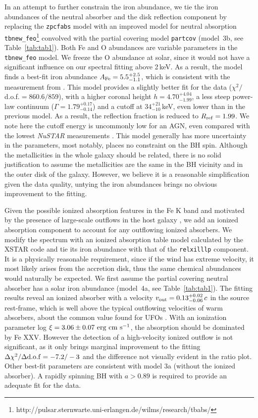 \documentclass[]{emulateapj}
\def \nustar {{\em NuSTAR }}
\begin{document}
In an attempt to further constrain the iron abundance, we tie the iron abundances of the neutral absorber and the disk reflection component by replacing the {\tt zpcfabs} model with an improved model for neutral absorption {\tt tbnew\_feo}\footnote{http://pulsar.sternwarte.uni-erlangen.de/wilms/research/tbabs/} convolved with the partial covering model {\tt partcov} (model~3b, see Table~\ref{tab:tab1}). Both Fe and O abundances are variable parameters in the {\tt tbnew\_feo} model. We freeze the O abundance at solar, since it would not have a significant influence on our spectral fitting above 2\,keV.  As a result, the model finds a best-fit iron abundance $A_{\rm Fe} = 5.5^{+2.5}_{-1.1}$, which is consistent with the measurement from \citealt{wes12}. This model provides a slightly better fit for the data ($\chi^{2}/$d.o.f.$=860.6/859$), with a higher coronal height $h = 4.70^{+4.04}_{-1.99}$, a less steep power-law continuum ($\Gamma = 1.79^{+0.17}_{-0.14}$) and a cutoff at $34^{+21}_{-10}$\,keV, even lower than in the previous model. As a result, the reflection fraction is reduced to $R_{\rm ref}=1.99$. We note here the cutoff energy is uncommonly low for an AGN, even compared with the lowest \nustar measurements \citep[e.g.,][]{urs15, tor16}. This model generally has more uncertainty in the parameters, most notably, places no constraint on the BH spin.  Although the metallicities in the whole galaxy should be related, there is no solid justification to assume the metallicities are the same in the BH vicinity and in the outer disk of the galaxy. However, we believe it is a reasonable simplification given the data quality, untying the iron abundances brings no obvious improvement to the fitting. 

Given the possible ionized absorption features in the Fe K band and motivated by the presence of large-scale outflows in the host galaxy \citep[e.g.,][]{wes12, bel13, rup15}, we add an ionized absorption component to account for any outflowing ionized absorbers. We modify the spectrum with an ionized absorption table model calculated by the {\small XSTAR} code \citep{kal01} and tie its iron abundance with that of the {\tt relxilllp} component. It is a physically reasonable requirement, since if the wind has extreme velocity, it most likely arises from the accretion disk, thus the same chemical abundances would naturally be expected.  We first assume the partial covering neutral absorber has a solar iron abundance (model~4a, see Table~\ref{tab:tab1}). The fitting results reveal an ionized absorber with a velocity $v_{\rm out} = 0.13^{+0.02}_{-0.06}\,c$ in the source rest-frame, which is well above the typical outflowing velocities of warm absorbers, about the common value found for UFOs \citep[e.g.,][]{tom10}. With an ionization parameter log$~\xi=3.06\pm0.07~\rm erg~cm~s^{-1}$, the absorption should be dominated by Fe XXV. However the detection of a high-velocity ionized outflow is not significant, as it only brings marginal improvement to the fitting $\Delta \chi^{2}/\Delta{\rm d.o.f} = -7.2/-3$ and the difference not visually evident in the ratio plot. Other best-fit parameters are consistent with model 3a (without the ionized absorber). A rapidly spinning BH with $a>0.89$ is required to provide an adequate fit for the data. 
\end{document}

